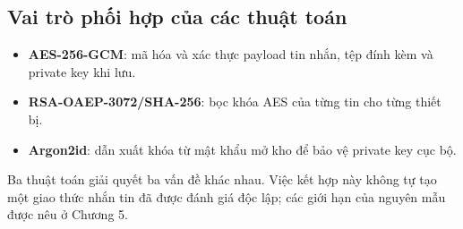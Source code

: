 \subsection{Vai trò phối hợp của các thuật toán}
\begin{itemize}
\item \textbf{AES-256-GCM}: mã hóa và xác thực payload tin nhắn, tệp đính kèm và private key khi lưu.
\item \textbf{RSA-OAEP-3072/SHA-256}: bọc khóa AES của từng tin cho từng thiết bị.
\item \textbf{Argon2id}: dẫn xuất khóa từ mật khẩu mở kho để bảo vệ private key cục bộ.
\end{itemize}
Ba thuật toán giải quyết ba vấn đề khác nhau. Việc kết hợp này không tự tạo một giao thức nhắn tin đã được đánh giá độc lập; các giới hạn của nguyên mẫu được nêu ở Chương 5.
